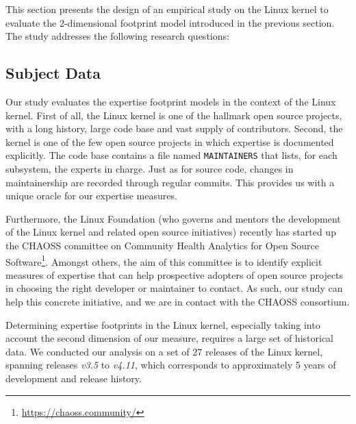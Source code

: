 This section presents the design of an empirical study on the Linux kernel to evaluate the 2-dimensional footprint model introduced in the previous section. The study addresses the following research questions:

\begin{RQ}
  \item \rqone
  \item \rqtwo
  \item \rqthree
\end{RQ}

\subsection{Subject Data}
\label{sec:subject-data}

Our study evaluates the expertise footprint models in the context of the Linux kernel. First of all, the Linux kernel is one of the hallmark open source projects, with a long history, large code base and vast supply of contributors. Second, the kernel is one of the few open source projects in which expertise is documented explicitly. The code base contains a file named \texttt{MAINTAINERS} that lists, for each subsystem, the experts in charge. Just as for source code, changes in maintainership are recorded through regular commits. This provides us with a unique oracle for our expertise measures.

Furthermore, the Linux Foundation (who governs and mentors the development of the Linux kernel and related open source initiatives) recently has started up the CHAOSS committee on Community Health Analytics for Open Source Software\footnote{\url{https://chaoss.community/}}. Amongst others, the aim of this committee is to identify explicit measures of expertise that can help prospective adopters of open source projects in choosing the right developer or maintainer to contact. As such, our study can help this concrete initiative, and we are in contact with the CHAOSS consortium.%

Determining expertise footprints in the Linux kernel, especially taking into account the second dimension of our measure, requires a large set of historical data. We conducted our analysis on a set of 27 releases of the Linux kernel, spanning releases \textit{v3.5} to \textit{v4.11}, which corresponds to approximately 5 years of development and release history. 


